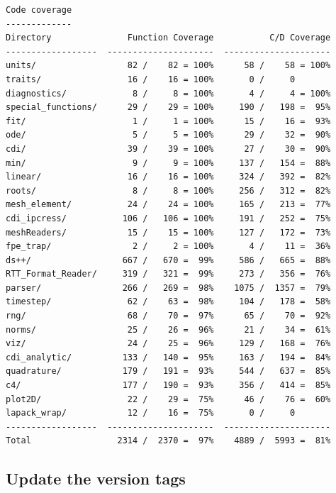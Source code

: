 \documentclass[note]{newmemo}
\begin{document}
\begin{lstlisting}[basicstyle=\footnotesize, xleftmargin=0.5in, 
  xrightmargin=0.5in]
Code coverage
-------------
Directory               Function Coverage           C/D Coverage
------------------  ---------------------  ---------------------
units/                  82 /    82 = 100%      58 /    58 = 100%
traits/                 16 /    16 = 100%       0 /     0       
diagnostics/             8 /     8 = 100%       4 /     4 = 100%
special_functions/      29 /    29 = 100%     190 /   198 =  95%
fit/                     1 /     1 = 100%      15 /    16 =  93%
ode/                     5 /     5 = 100%      29 /    32 =  90%
cdi/                    39 /    39 = 100%      27 /    30 =  90%
min/                     9 /     9 = 100%     137 /   154 =  88%
linear/                 16 /    16 = 100%     324 /   392 =  82%
roots/                   8 /     8 = 100%     256 /   312 =  82%
mesh_element/           24 /    24 = 100%     165 /   213 =  77%
cdi_ipcress/           106 /   106 = 100%     191 /   252 =  75%
meshReaders/            15 /    15 = 100%     127 /   172 =  73%
fpe_trap/                2 /     2 = 100%       4 /    11 =  36%
ds++/                  667 /   670 =  99%     586 /   665 =  88%
RTT_Format_Reader/     319 /   321 =  99%     273 /   356 =  76%
parser/                266 /   269 =  98%    1075 /  1357 =  79%
timestep/               62 /    63 =  98%     104 /   178 =  58%
rng/                    68 /    70 =  97%      65 /    70 =  92%
norms/                  25 /    26 =  96%      21 /    34 =  61%
viz/                    24 /    25 =  96%     129 /   168 =  76%
cdi_analytic/          133 /   140 =  95%     163 /   194 =  84%
quadrature/            179 /   191 =  93%     544 /   637 =  85%
c4/                    177 /   190 =  93%     356 /   414 =  85%
plot2D/                 22 /    29 =  75%      46 /    76 =  60%
lapack_wrap/            12 /    16 =  75%       0 /     0       
------------------  ---------------------  ---------------------
Total                 2314 /  2370 =  97%    4889 /  5993 =  81%
\end{lstlisting}


\subsection{Update the version tags}
\label{sec:update_tags}
\end{document}
